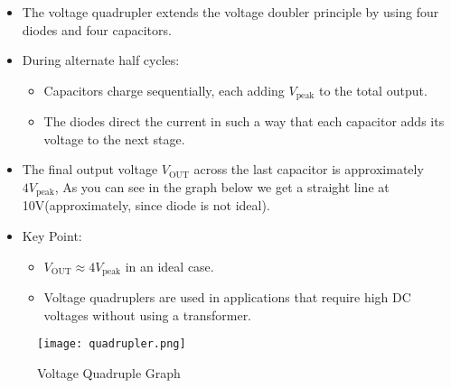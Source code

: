 \documentclass[9pt,conference]{IEEEtran}
\begin{document}
\begin{itemize}
    \item The voltage quadrupler extends the voltage doubler principle by using four diodes and four capacitors.
    \item During alternate half cycles:
    \begin{itemize}
        \item Capacitors charge sequentially, each adding \( V_{\text{peak}} \) to the total output.
        \item The diodes direct the current in such a way that each capacitor adds its voltage to the next stage.
    \end{itemize}
    \item The final output voltage \( V_{\text{OUT}} \) across the last capacitor is approximately \( 4V_{\text{peak}} \), As you can see in the graph below we get a straight line at 10V(approximately, since diode is not ideal).
    \item Key Point:
    \begin{itemize}
        \item \( V_{\text{OUT}} \approx 4V_{\text{peak}} \) in an ideal case.
        \item Voltage quadruplers are used in applications that require high DC voltages without using a transformer.
    \end{itemize}
\end{itemize}
\begin{figure}[H]
    \centering
    \texttt{[image: quadrupler.png]}
    \caption{Voltage Quadruple Graph}
    \label{fig:positive_clamper}
\end{figure}
\end{document}

